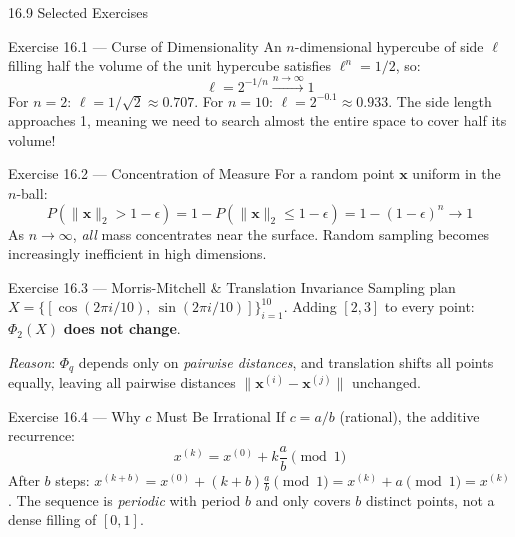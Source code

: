 \documentclass[aspectratio=169,10pt]{beamer}
\begin{document}
\begin{frame}[allowframebreaks]{16.9 Selected Exercises}
  \begin{exampleblock}{Exercise 16.1 --- Curse of Dimensionality}
    An $n$-dimensional hypercube of side $\ell$ filling half the volume
    of the unit hypercube satisfies $\ell^n = 1/2$, so:
    \[
      \ell = 2^{-1/n} \xrightarrow{n\to\infty} 1
    \]
    For $n=2$: $\ell = 1/\sqrt{2} \approx 0.707$.
    For $n=10$: $\ell = 2^{-0.1} \approx 0.933$.
    The side length approaches 1, meaning we need to search
    almost the entire space to cover half its volume!
  \end{exampleblock}

  \begin{exampleblock}{Exercise 16.2 --- Concentration of Measure}
    For a random point $\mathbf{x}$ uniform in the $n$-ball:
    \[
      P(\|\mathbf{x}\|_2 > 1-\epsilon)
        = 1 - P(\|\mathbf{x}\|_2 \le 1-\epsilon)
        = 1 - (1-\epsilon)^n \to 1
    \]
    As $n\to\infty$, \emph{all} mass concentrates near the surface.
    Random sampling becomes increasingly inefficient in high dimensions.
  \end{exampleblock}

  \framebreak

  \begin{exampleblock}{Exercise 16.3 --- Morris-Mitchell \& Translation Invariance}
    Sampling plan $X = \{[\cos(2\pi i/10),\,\sin(2\pi i/10)]\}_{i=1}^{10}$.
    Adding $[2,3]$ to every point: $\Phi_2(X)$ \textbf{does not change}.

    \textit{Reason}: $\Phi_q$ depends only on \emph{pairwise distances},
    and translation shifts all points equally, leaving all pairwise distances
    $\|\mathbf{x}^{(i)} - \mathbf{x}^{(j)}\|$ unchanged.
  \end{exampleblock}

  \begin{exampleblock}{Exercise 16.4 --- Why $c$ Must Be Irrational}
    If $c = a/b$ (rational), the additive recurrence:
    \[
      x^{(k)} = x^{(0)} + k\frac{a}{b} \pmod{1}
    \]
    After $b$ steps: $x^{(k+b)} = x^{(0)} + (k+b)\frac{a}{b} \pmod{1}
      = x^{(k)} + a \pmod{1} = x^{(k)}$.
    The sequence is \emph{periodic} with period $b$ and only covers
    $b$ distinct points, not a dense filling of $[0,1]$.
  \end{exampleblock}
\end{frame}
\end{document}
